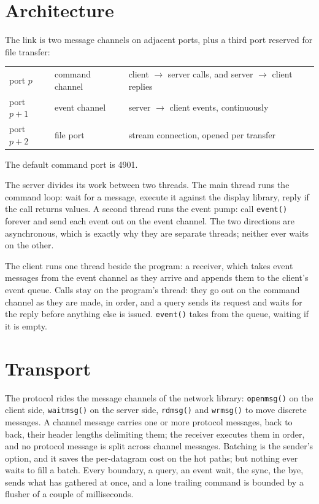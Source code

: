 \documentclass[11pt]{article}
\begin{document}
\section{Architecture}

The link is two message channels on adjacent ports, plus a third port
reserved for file transfer:

\begin{center}
\begin{tabular}{lll}
port $p$   & command channel & client $\rightarrow$ server calls, and
                               server $\rightarrow$ client replies \\
port $p+1$ & event channel   & server $\rightarrow$ client events,
                               continuously \\
port $p+2$ & file port       & stream connection, opened per transfer \\
\end{tabular}
\end{center}

The default command port is 4901.

The server divides its work between two threads. The main thread runs the
command loop: wait for a message, execute it against the display library,
reply if the call returns values. A second thread runs the event pump: call
\texttt{event()} forever and send each event out on the event channel. The
two directions are asynchronous, which is exactly why they are separate
threads; neither ever waits on the other.

The client runs one thread beside the program: a receiver, which takes
event messages from the event channel as they arrive and appends them to
the client's event queue. Calls stay on the program's thread: they go out
on the command channel as they are made, in order, and a query sends its
request and waits for the reply before anything else is issued.
\texttt{event()} takes from the queue, waiting if it is empty.

\section{Transport}

The protocol rides the message channels of the network library:
\texttt{openmsg()} on the client side, \texttt{waitmsg()} on the server
side, \texttt{rdmsg()} and \texttt{wrmsg()} to move discrete messages. A
channel message carries one or more protocol messages, back to back, their
header lengths delimiting them; the receiver executes them in order, and no
protocol message is split across channel messages. Batching is the sender's
option, and it saves the per-datagram cost on the hot paths; but nothing
ever waits to fill a batch. Every boundary, a query, an event wait, the
sync, the bye, sends what has gathered at once, and a lone trailing command
is bounded by a flusher of a couple of milliseconds.
\end{document}
